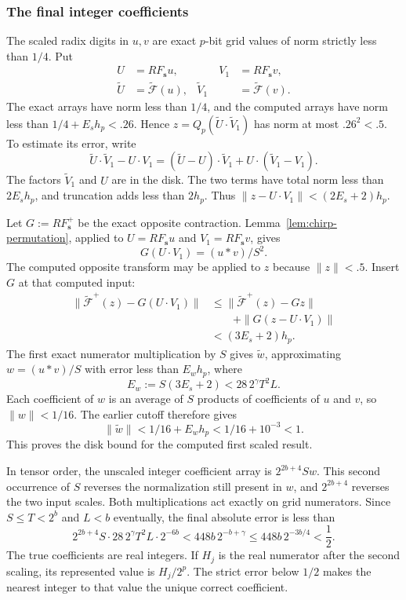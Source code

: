 \documentclass[11pt]{article}
\theoremstyle{definition}
\begin{document}
\subsubsection{The final integer coefficients}

The scaled radix digits in $u,v$ are exact $p$-bit grid values of norm
strictly less than $1/4$.  Put
\[
 \begin{aligned}
 U&=RF_{\boldsymbol s}u,&\qquad V_1&=RF_{\boldsymbol s}v,\\
 \widetilde U&=\widetilde{\mathscr F}(u),&
 \widetilde V_1&=\widetilde{\mathscr F}(v).
 \end{aligned}
\]
The exact arrays have norm less than $1/4$, and the computed arrays
have norm less than $1/4+E_sh_p<.26$.  Hence
$z=Q_p(\widetilde U\cdot\widetilde V_1)$ has norm at most
$.26^2<.5$.  To estimate its error, write
\[
 \widetilde U\cdot\widetilde V_1-U\cdot V_1
 =(\widetilde U-U)\cdot\widetilde V_1
       +U\cdot(\widetilde V_1-V_1).
\]
The factors $\widetilde V_1$ and $U$ are in the disk.  The two terms
have total norm less than $2E_sh_p$, and truncation adds less than $2h_p$.
Thus $\|z-U\cdot V_1\|<(2E_s+2)h_p$.

Let $G:=RF_{\boldsymbol s}^+$ be the exact opposite contraction.
Lemma~\ref{lem:chirp-permutation}, applied to
$U=RF_{\boldsymbol s}u$ and $V_1=RF_{\boldsymbol s}v$, gives
\[
 G(U\cdot V_1)=(u*v)/S^2.
\]
The computed opposite transform may be applied to $z$ because
$\|z\|<.5$. Insert $G$ at that computed input:
\[
 \begin{aligned}
 \|\widetilde{\mathscr F}^{+}(z)-G(U\cdot V_1)\|
 &\le \|\widetilde{\mathscr F}^{+}(z)-Gz\|\\
 &\qquad+\|G(z-U\cdot V_1)\|\\
 &<(3E_s+2)h_p.
 \end{aligned}
\]
The first exact numerator multiplication by $S$ gives
$\widetilde w$, approximating $w=(u*v)/S$ with error less than
$E_wh_p$, where
\[
 E_w:=S(3E_s+2)<28\,2^\gamma T^2L.
\]
Each coefficient of $w$ is an average of $S$ products of coefficients
of $u$ and $v$, so $\|w\|<1/16$.  The earlier cutoff therefore gives
\[
 \|\widetilde w\|<1/16+E_wh_p<1/16+10^{-3}<1.
\]
This proves the disk bound for the computed first scaled result.

In tensor order, the unscaled integer coefficient array is
$2^{2b+4}S w$.  This second occurrence of $S$ reverses the
normalization still present in $w$, and $2^{2b+4}$ reverses the two
input scales.  Both multiplications act exactly on grid numerators.
Since $S\le T<2^b$ and $L<b$ eventually, the final absolute error is less than
\begin{equation}\label{eq:final-error}
 2^{2b+4}S\cdot28\,2^\gamma T^2L\cdot2^{-6b}
 <448b\,2^{-b+\gamma}
 \le448b\,2^{-3b/4}<\frac12.
\end{equation}
The true coefficients are real integers.  If $H_j$ is the real
numerator after the second scaling, its represented value is
$H_j/2^p$.  The strict error below $1/2$ makes the nearest integer to
that value the unique correct coefficient.
\end{document}
